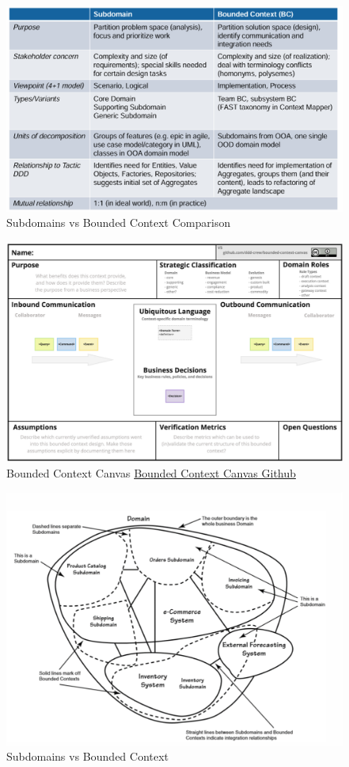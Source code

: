 \documentclass[../Main.tex]{subfiles}
\begin{document}
\begin{figure}[H]
    \centering
    \includegraphics[width=1\linewidth]{Images/subdomain-vs-bc.png}
    \caption{Subdomains vs Bounded Context Comparison}
\end{figure}

\begin{figure}[H]
    \centering
    \includegraphics[width=0.8\linewidth]{Images/bounded-context-canvas.jpg}
    \caption{Bounded Context Canvas \href{https://github.com/ddd-crew/bounded-context-canvas}{Bounded Context Canvas Github}}
\end{figure}

\begin{figure}[H]
    \centering
    \includegraphics[width=1\linewidth]{Images/subdomains-bounded-context.png}
    \caption{Subdomains vs Bounded Context}
\end{figure}
\end{document}
